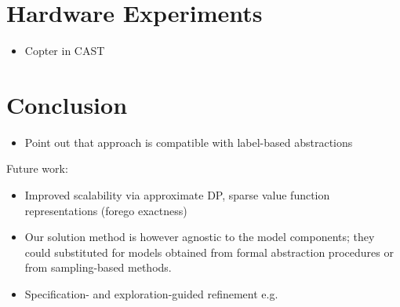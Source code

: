 \documentclass[conference]{IEEEtran}
\renewcommand{\cite}[1]{\citep{#1}}
\begin{document}

\section{Hardware Experiments}
\label{sec:hardware}

\begin{itemize}
    \item Copter in CAST
\end{itemize}


\section{Conclusion}
\label{sec:conclusion}

\begin{itemize}
	\item Point out that approach is compatible with label-based abstractions
\end{itemize}

Future work:
\begin{itemize}
	\item Improved scalability via approximate DP, sparse value function representations (forego exactness)
	\item Our solution method is however agnostic to the model components; they could substituted for models obtained from formal abstraction procedures or from sampling-based methods.
  \item Specification- and exploration-guided refinement e.g. \cite{Nilsson2017}
\end{itemize}




\end{document}
